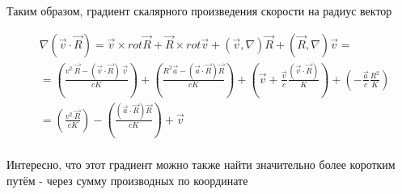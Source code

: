 \documentclass[11pt]{article}
\begin{document}
Таким образом, градиент скалярного произведения скорости на радиус
вектор

\[\begin{align}
  & \nabla \left( \overrightarrow{v}\cdot \overrightarrow{R} \right)=\overrightarrow{v}\times rot\overrightarrow{R}+\overrightarrow{R}\times rot\overrightarrow{v}+\left( \overrightarrow{v},\nabla  \right)\overrightarrow{R}+\left( \overrightarrow{R},\nabla  \right)\overrightarrow{v}= \\ 
 & =\left( \frac{{{v}^{2}}\ \overrightarrow{R}-\left( \overrightarrow{v}\cdot \overrightarrow{R} \right)\ \overrightarrow{v}}{cK} \right)+\left( \frac{{{R}^{2}}\overrightarrow{a}-\left( \overrightarrow{a}\cdot \overrightarrow{R} \right)\overrightarrow{R}}{cK} \right)+\left( \overrightarrow{v}+\frac{\overrightarrow{v}}{c}\frac{\left( \overrightarrow{v}\cdot \overrightarrow{R} \right)}{K} \right)+\left( -\frac{\overrightarrow{a}}{c}\frac{{{R}^{2}}}{K} \right) \\ 
 & =\left( \frac{{{v}^{2}}\ \overrightarrow{R}}{cK} \right)-\left( \frac{\left( \overrightarrow{a}\cdot \overrightarrow{R} \right)\overrightarrow{R}}{cK} \right)+\overrightarrow{v} \\ 
\end{align}\]

 Интересно, что этот градиент можно также найти значительно
более коротким путём - через сумму производных по координате
\end{document}
